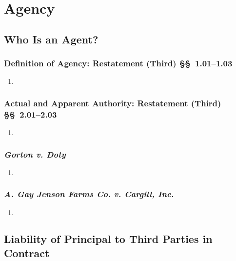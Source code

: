 \section{Agency}

\subsection{Who Is an Agent?}

\subsubsection{Definition of Agency: Restatement (Third) \S\S\ 1.01--1.03}

\begin{enumerate}
    \item %
\end{enumerate}

\subsubsection{Actual and Apparent Authority: Restatement (Third) \S\S\ 
2.01--2.03}

\begin{enumerate}
    \item %
\end{enumerate}

\subsubsection{\emph{Gorton v. Doty}}

\begin{enumerate}
    \item %
\end{enumerate}

\subsubsection{\emph{A. Gay Jenson Farms Co. v. Cargill, Inc.}}

\begin{enumerate}
    \item %
\end{enumerate}

\subsection{Liability of Principal to Third Parties in Contract}

